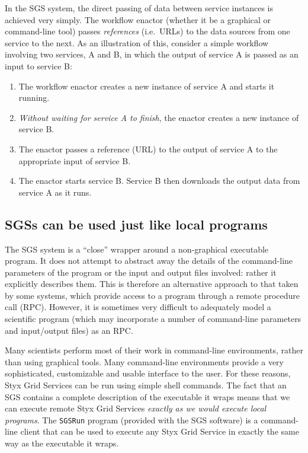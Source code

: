 \documentclass{llncs}
\begin{document}
In the SGS system, the direct passing of data between service instances is achieved very simply.  The workflow enactor (whether it be a graphical or command-line tool) passes {\em references\/} (i.e.\ URLs) to the data sources from one service to the next.  As an illustration of this, consider a simple workflow involving two services, A and B, in which the output of service A is passed as an input to service B:
\begin{enumerate}
	\item The workflow enactor creates a new instance of service A and starts it running.
	\item {\em Without waiting for service A to finish\/}, the enactor creates a new instance of service B.
	\item The enactor passes a reference (URL) to the output of service A to the appropriate input of service B.
	\item The enactor starts service B.  Service B then downloads the output data from service A as it runs.
\end{enumerate}

\subsection{SGSs can be used just like local programs}
The SGS system is a ``close'' wrapper around a non-graphical executable program.  It does not attempt to abstract away the details of the command-line parameters of the program or the input and output files involved: rather it explicitly describes them.  This is therefore an alternative approach to that taken by some systems, which provide access to a program through a remote procedure call (RPC).  However, it is sometimes very difficult to adequately model a scientific program (which may incorporate a number of command-line parameters and input/output files) as an RPC.

Many scientists perform most of their work in command-line environments, rather than using graphical tools.  Many command-line environments provide a very sophisticated, customizable and usable interface to the user.  For these reasons, Styx Grid Services can be run using simple shell commands.  The fact that an SGS contains a complete description of the executable it wraps means that we can execute remote Styx Grid Services {\em exactly as we would execute local programs\/}.  The {\tt SGSRun} program (provided with the SGS software) is a command-line client that can be used to execute any Styx Grid Service in exactly the same way as the executable it wraps.
\end{document}
